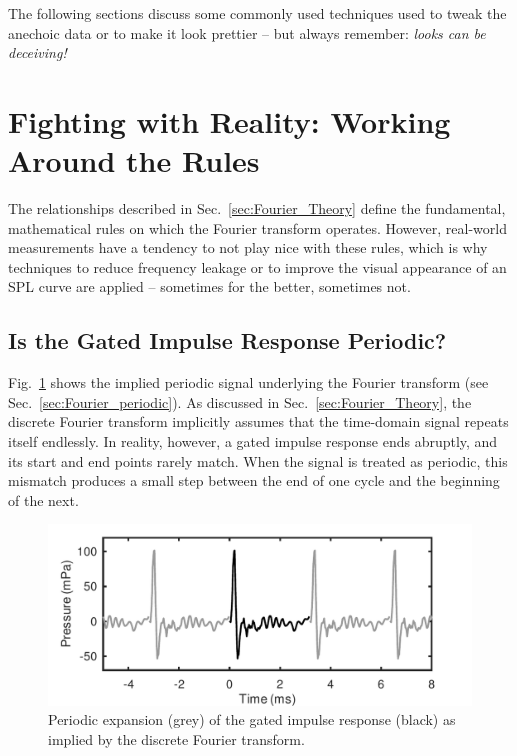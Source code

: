 \documentclass[12pt,a4paper]{article}
\providecommand{\seclabel}[1]{\label{sec:#1}}
\providecommand{\secn}[1]{Sec.~\ref{sec:#1}}
\providecommand{\figlabel}[1]{\label{fig:#1}}
\providecommand{\figr}[1]{Fig.~\ref{fig:#1}}
\begin{document}
The following sections discuss some commonly used techniques used to tweak the anechoic data or to make it look prettier -- but always remember: \emph{looks can be deceiving!}


\section{Fighting with Reality: Working Around the Rules}

The relationships described in \secn{Fourier_Theory} define the fundamental, mathematical rules on which the Fourier transform operates. However, real-world measurements have a tendency to not play nice with these rules, which is why techniques to reduce frequency leakage or to improve the visual appearance of an SPL curve are applied -- sometimes for the better, sometimes not.


\subsection{Is the Gated Impulse Response Periodic?}\seclabel{windowing}

\figr{FIGURE3} shows the implied periodic signal underlying the Fourier transform (see \secn{Fourier_periodic}). As discussed in \secn{Fourier_Theory}, the discrete Fourier transform implicitly assumes that the time-domain signal repeats itself endlessly. In reality, however, a gated impulse response ends abruptly, and its start and end points rarely match. When the signal is treated as periodic, this mismatch produces a small step between the end of one cycle and the beginning of the next.

\begin{figure}[tbp]
  \begin{center}
    \includegraphics[width=\textwidth]{FIGURE3}
    \caption{Periodic expansion (grey) of the gated impulse response (black) as implied by the discrete Fourier transform.}
    \figlabel{FIGURE3}
  \end{center}
\end{figure}
\end{document}
